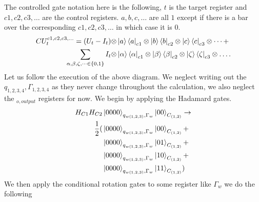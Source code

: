 \documentclass{article}
\begin{document}
The controlled gate notation here is the following, $t$ is the target register and $c1,c2,c3,\dots$ are the control registers. $a,b,c,\dots$ are all $1$ except if there is a bar over the corresponding $c1,c2,c3,\dots$ in which case it is $0$. 
\begin{equation}
    \begin{split}
        CU^{c1,c2,c3,\dots}_t = (U_t-I_t)\otimes &\ket{a}\bra{a}_{c1} \otimes \ket{b}\bra{b}_{c2} \otimes \ket{c}\bra{c}_{c3}\otimes\dots+\\ 
        \sum_{\alpha,\beta,\zeta,\dots\in\{0,1\}}I_t\otimes &\ket{\alpha}\bra{\alpha}_{c1} \otimes \ket{\beta}\bra{\beta}_{c2} \otimes \ket{\zeta}\bra{\zeta}_{c3}\otimes\dots. 
    \end{split}
\end{equation}
Let us follow the execution of the above diagram.
We neglect writing out the $q_{1,2,3,4},\Gamma_{1,2,3,4}$ as they never change throughout the calculation, we also neglect the $ _{o,output}$ registers for now.
We begin by applying the Hadamard gates.
\begin{equation}
    \begin{split}
        H_{C1}H_{C2}&\ket{0000}_{q_{w(1,2,3)},\Gamma_w}\ket{ 00}_{C_{(1,2)}}\to\\
        \frac{1}{2}(
        &\ket{0000}_{q_{w(1,2,3)},\Gamma_w}\ket{ 00}_{C_{(1,2)}}+\\
        &\ket{0000}_{q_{w(1,2,3)},\Gamma_w}\ket{ 01}_{C_{(1,2)}}+\\
        &\ket{0000}_{q_{w(1,2,3)},\Gamma_w}\ket{ 10}_{C_{(1,2)}}+\\
        &\ket{0000}_{q_{w(1,2,3)},\Gamma_w}\ket{ 11}_{C_{(1,2)}}
        )
    \end{split}
\end{equation}
We then apply the conditional rotation gates to some register like $\Gamma_w$ we do the following
\end{document}
